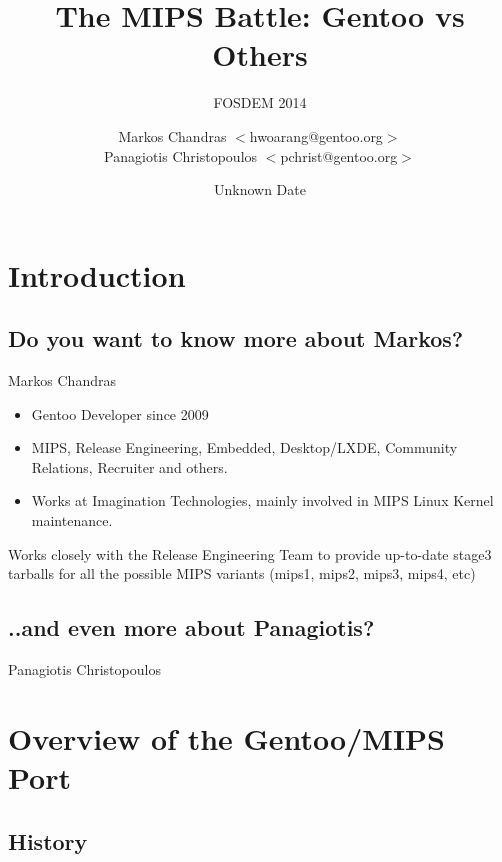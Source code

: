 \documentclass{beamer}
\title{The MIPS Battle: Gentoo vs Others}
\subtitle{FOSDEM 2014}
\author[Markos Chandras \& Panagiotis Christopoulos]{Markos Chandras $<$hwoarang@gentoo.org$>$ \\ Panagiotis Christopoulos $<$pchrist@gentoo.org$>$}
\date{Unknown Date}
\begin{document}
\frame{\titlepage}

\section{Introduction}

\subsection{Do you want to know more about Markos?}

\begin{frame}{Markos Chandras}
	\begin{itemize}
		\item Gentoo Developer since 2009
		\item MIPS, Release Engineering, Embedded, Desktop/LXDE, Community Relations, Recruiter and others.
		\item Works at Imagination Technologies, mainly involved in MIPS Linux Kernel maintenance.
	\end{itemize}
	Works closely with the Release Engineering Team to provide up-to-date stage3 tarballs for all the possible MIPS variants (mips1, mips2, mips3, mips4, etc)
\end{frame}

\subsection{..and even more about Panagiotis?}
\begin{frame}{Panagiotis Christopoulos}
\end{frame}

\section{Overview of the Gentoo/MIPS Port}

\subsection{History}
\end{document}
